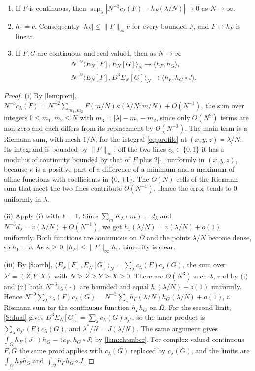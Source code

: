 \documentclass[11pt,colorlinks]{charlie}
\newcommand{\Om}{\Omega}
\newcommand{\ip}[2]{\langle #1,#2\rangle}
\begin{document}
\begin{lemma}[Profiles]\label{lem:profiles}
\begin{enumerate}[label=\textup{(\roman*)}]
\item If $F$ is continuous, then $\sup_\lambda|N^{-3}c_\lambda(F)-h_F(\lambda/N)|\to0$ as $N\to\infty$.
\item $h_1=v$. Consequently $|h_F|\le\|F\|_\infty v$ for every bounded $F$, and $F\mapsto h_F$ is linear.
\item If $F,G$ are continuous and real-valued, then as $N\to\infty$
\begin{gather*}
 N^{-9}\ip{E_N[F]}{E_N[G]}_N\to\ip{h_F}{h_G},\\
 N^{-9}\ip{E_N[F]}{D^3\overline{E_N[G]}}_N\to\ip{h_F}{h_G\circ J}.
\end{gather*}
\end{enumerate}
\end{lemma}
\begin{proof}
(i) By \cref{lem:pieri}, $N^{-3}c_\lambda(F)=N^{-2}\sum_{m_1,m_2}F(m/N)\kappa(\lambda/N;m/N)+O(N^{-1})$, the sum over integers $0\le m_1,m_2\le N$ with $m_3=|\lambda|-m_1-m_2$, since only $O(N^2)$ terms are non-zero and each differs from its replacement by $O(N^{-3})$. The main term is a Riemann sum, with mesh $1/N$, for the integral \eqref{eq:profile} at $(x,y,z)=\lambda/N$. Its integrand is bounded by $\|F\|_\infty$; off the two lines $c_3\in\{0,1\}$ it has a modulus of continuity bounded by that of $F$ plus $2|\cdot|$, uniformly in $(x,y,z)$, because $\kappa$ is a positive part of a difference of a minimum and a maximum of affine functions with coefficients in $\{0,\pm1\}$. The $O(N)$ cells of the Riemann sum that meet the two lines contribute $O(N^{-1})$. Hence the error tends to $0$ uniformly in $\lambda$.

(ii) Apply (i) with $F=1$. Since $\sum_mK_\lambda(m)=d_\lambda$ and $N^{-3}d_\lambda=v(\lambda/N)+O(N^{-1})$, we get $h_1(\lambda/N)=v(\lambda/N)+o(1)$ uniformly. Both functions are continuous on $\overline\Om$ and the points $\lambda/N$ become dense, so $h_1=v$. As $\kappa\ge0$, $|h_F|\le\|F\|_\infty h_1$. Linearity is clear.

(iii) By \ref{S:orth}, $\ip{E_N[F]}{E_N[G]}_N=\sum_\lambda c_\lambda(F)c_\lambda(G)$, the sum over $\lambda'=(Z,Y,X)$ with $N\ge Z\ge Y\ge X\ge0$. There are $O(N^3)$ such $\lambda$, and by (i) and (ii) both $N^{-3}c_\lambda(\cdot)$ are bounded and equal $h_\cdot(\lambda/N)+o(1)$ uniformly. Hence $N^{-9}\sum_\lambda c_\lambda(F)c_\lambda(G)=N^{-3}\sum_\lambda h_F(\lambda/N)h_G(\lambda/N)+o(1)$, a Riemann sum for the continuous function $h_Fh_G$ on $\overline\Om$. For the second limit, \ref{S:dual} gives $D^3\overline{E_N[G]}=\sum_\lambda c_\lambda(G)s_{\lambda^*}$, so the inner product is $\sum_\lambda c_{\lambda^*}(F)c_\lambda(G)$, and $\lambda^*/N=J(\lambda/N)$. The same argument gives $\int_\Om h_F(J\cdot)h_G=\ip{h_F}{h_G\circ J}$ by \cref{lem:chamber}. For complex-valued continuous $F,G$ the same proof applies with $c_\lambda(G)$ replaced by $\overline{c_\lambda(G)}$, and the limits are $\int_\Om h_F\overline{h_G}$ and $\int_\Om h_F\,\overline{h_G\circ J}$.
\end{proof}
\end{document}

